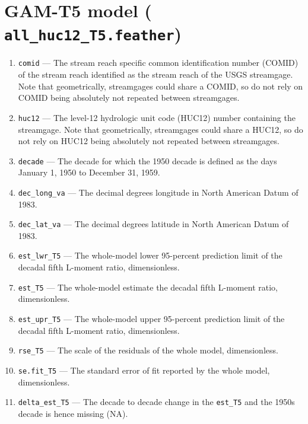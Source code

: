\documentclass[1p, authoryear, 11pt, times, preprint]{elsarticle}
\newcommand{\code}[1]{{\color{black}%
                       \mbox{\lstinline[basicstyle={\small\ttfamily},
                                        keywordstyle=\scriptsize\ttfamily]|#1|}}}
\begin{document}
\section{GAM-T5 model (\code{all_huc12_T5.feather})}
\begin{enumerate}
\footnotesize
\RaggedRight
\item \code{comid} --- The stream reach specific common identification number (COMID) of the stream reach identified as the stream reach of the USGS streamgage. Note that geometrically, streamgages could share a COMID, so do not rely on COMID being absolutely not repeated between streamgages.
\item \code{huc12} --- The level-12 hydrologic unit code (HUC12) number containing the streamgage. Note that geometrically, streamgages could share a HUC12, so do not rely on HUC12 being absolutely not repeated between streamgages.
\item \code{decade} --- The decade for which the 1950 decade is defined as the days January 1, 1950 to December 31, 1959.
\item \code{dec_long_va} --- The decimal degrees longitude in North American Datum of 1983.
\item \code{dec_lat_va} --- The decimal degrees latitude in North American Datum of 1983.
\item \code{est_lwr_T5} --- The whole-model lower 95-percent prediction limit of the decadal fifth L-moment ratio, dimensionless.
\item \code{est_T5} --- The whole-model estimate the decadal fifth L-moment ratio, dimensionless.
\item \code{est_upr_T5} --- The whole-model upper 95-percent prediction limit of the decadal fifth L-moment ratio, dimensionless.
\item \code{rse_T5} --- The scale of the residuals of the whole model, dimensionless.
\item \code{se.fit_T5} --- The standard error of fit reported by the whole model, dimensionless.
\item \code{delta_est_T5} --- The decade to decade change in the \code{est_T5} and the 1950s decade is hence missing (NA).
\end{enumerate}

 
\end{document}
